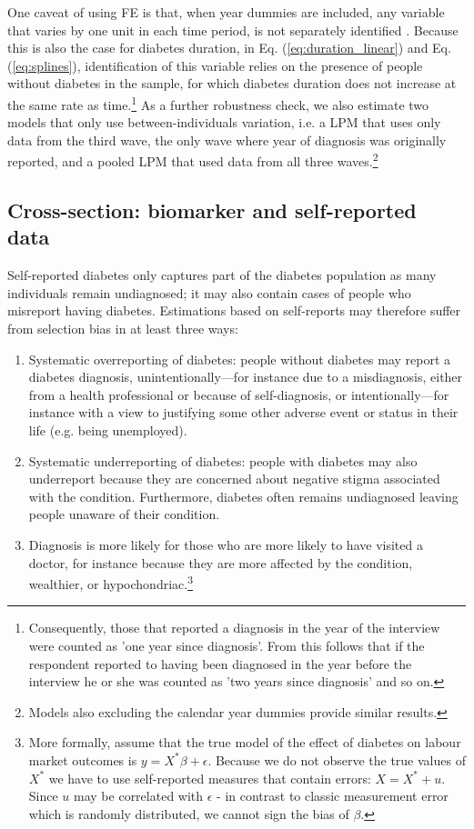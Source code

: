 One caveat of using \ac{FE} is that, when year dummies are included, any variable that varies by one unit in each time period, is not separately identified \parencite{Wooldridge2012}. Because this is also the case for diabetes duration, in Eq. (\ref{eq:duration_linear}) and Eq. (\ref{eq:splines}), identification of this variable relies on the presence of people without diabetes in the sample, for which diabetes duration does not increase at the same rate as time.\footnote{Consequently, those that reported a diagnosis in the year of the interview were counted as 'one year since diagnosis'. From this follows that if the respondent reported to having been diagnosed in the year before the interview he or she was counted as 'two years since diagnosis' and so on.} As a further robustness check, we also estimate two models that only use between-individuals variation, i.e. a \ac{LPM} that uses only data from the third wave, the only wave where year of diagnosis was originally reported, and a pooled \ac{LPM} that used data from all three waves.\footnote{Models also excluding the calendar year dummies provide similar results.}

\subsection{\label{sec:Biomarker Strategy}Cross-section: biomarker and self-reported data}

Self-reported diabetes only captures part of the diabetes population as many individuals remain undiagnosed; it may also contain cases of people who misreport having diabetes.  Estimations based on self-reports may therefore suffer from selection bias in at least three ways:

\begin{enumerate}
\item Systematic overreporting of diabetes: people without diabetes
may report a diabetes diagnosis, unintentionally---for instance due to a misdiagnosis, either from a health professional or because of self-diagnosis, or intentionally---for instance with a view to justifying some other adverse event or status in their life (e.g. being unemployed). 
\item Systematic underreporting of diabetes: people with diabetes may also underreport because they are concerned about negative stigma associated with the condition. Furthermore, diabetes often remains undiagnosed leaving people unaware of their condition.
\item Diagnosis is more likely for those who are more likely to have visited a doctor, for instance because they are more affected by the condition, wealthier, or hypochondriac.\footnote{More formally, assume that the true model of the effect of diabetes on labour market outcomes is $y=X^{*}\beta+\epsilon$. Because we do not observe the true values of  $X^{*}$  we have to use self-reported measures that contain errors: $X=X^{*} + u$. Since $u$ may be correlated with $\epsilon$ - in contrast to classic measurement error which is randomly distributed, we cannot sign the bias of  $\beta$.}    
\end{enumerate} 

